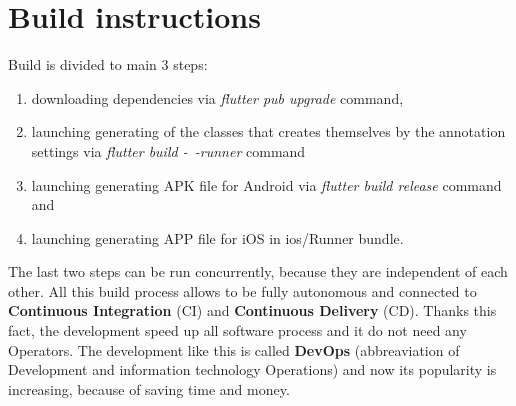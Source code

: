 \section{Build instructions}\label{sec:build-instructions}
Build is divided to main 3 steps:
\begin{enumerate}
    \item downloading dependencies via \textit{flutter pub upgrade} command,
    \item launching generating of the classes that creates themselves by the annotation settings via \textit{flutter build -~-runner} command
    \item launching generating APK file for Android via \textit{flutter build release} command and
    \item launching generating APP file for iOS in ios/Runner bundle.
\end{enumerate}
The last two steps can be run concurrently, because they are independent of each other.
All this build process allows to be fully autonomous and connected to \textbf{Continuous Integration} (CI) and \textbf{Continuous Delivery} (CD).
Thanks this fact, the development speed up all software process and it do not need any Operators.
The development like this is called \textbf{DevOps} (abbreaviation of Development and information technology Operations) and now its popularity is increasing, because of saving time and money.
